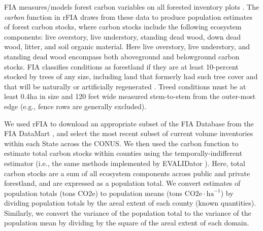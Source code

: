 \documentclass[11pt]{article}
\begin{document}
FIA measures/models forest carbon variables on all forested inventory plots \citep{domke2021}. The \textit{carbon} function in rFIA draws from these data to produce population estimates of forest carbon stocks, where carbon stocks include the following ecosystem components: live overstory, live understory, standing dead wood, down dead wood, litter, and soil organic material. Here live overstory, live understory, and standing dead wood encompass both aboveground and belowground carbon stocks. FIA classifies conditions as forestland if they are at least 10-percent stocked by trees of any size, including land that formerly had such tree cover and that will be naturally or artificially regenerated \citep{database}. Treed conditions must be at least 0.4ha in size and 120 feet wide measured stem-to-stem from the outer-most edge (e.g., fence rows are generally excluded).

We used rFIA to download an appropriate subset of the FIA Database from the FIA DataMart \citep{datamart}, and select the most recent subset of current volume inventories within each State across the CONUS. We then used the carbon function to estimate total carbon stocks within counties using the temporally-indifferent estimator (i.e., the same methods implemented by EVALIDator \citep{evalidator}). Here, total carbon stocks are a sum of all ecosystem components across public and private forestland, and are expressed as a population total. We convert estimates of population totals (tons CO2e) to population means (tons  $\mathrm{CO2e}  \cdot  \mathrm{ha}^{-1}$) by dividing population totals by the areal extent of each county (known quantities). Similarly, we convert the variance of the population total to the variance of the population mean by dividing by the square of the areal extent of each domain. 
\end{document}
